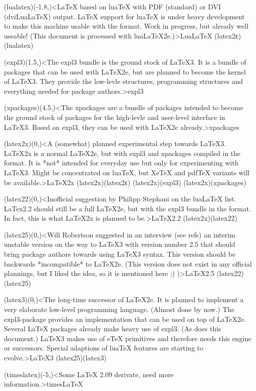 {	\tonode[\vip](lualatex)(-1.8,\layer)<LaTeX based on luaTeX with PDF (standard) or DVI (dviLuaLaTeX) output. LaTeX support for luaTeX is under heavy development to make this machine usable with the format. Work in progress, but already well useable! (This document is processed with luaLaTeX2e.)>{Lua\LaTeX}
	\todraw*(latex2ε)(lualatex)
	\steplayer[-1.5]

	\tonode[\package](expl3)(1.5,\layer)<The expl3 bundle is the ground stock of LaTeX3. It is a bundle of packages that can be used with LaTeX2e, but are planned to become the kernel of LaTeX3. They provide the low-levle structures, programming structures and everything needed for package authors.>{expl3}

	\tonode[\package](xpackages)(4.5,\layer)<The xpackages are a bundle of packages intended to become the ground stock of packages for the high-levle and user-level interface in LaTeX3. Based on expl3, they can be used with LaTeX2e already.>{xpackages}
	\steplayer[-1.5]

	\tonode[\planned](latex2x)(0,\layer)<A (somewhat) planned experimental step towards LaTeX3. LaTeX2x is a normal LaTeX2e, but with expl3 and xpackages compiled in the format. It is *not* intended for everyday use but only for experimenting with LaTeX3. Might be concentrated on luaTeX, but XeTeX and pdfTeX variants will be available.>{\LaTeX2x}
	\todraw(latex2x)(latex2ε)
	\todraw(latex2x)(expl3)
	\todraw(latex2x)(xpackages)
	\steplayer[-2]

	\tonode[\planned](latex22)(0,\layer)<Inofficial suggestion by Philipp Stephani on the luaLaTeX list. LaTex2.2 should still be a full LaTeX2e, but with the expl3 bundle in the format. In fact, this is what LaTeX2x is planned to be.>{\LaTeX2.2}
	\todraw(latex2x)(latex22)
	\steplayer[-2]

	\tonode[\planned](latex25)(0,\layer)<Will Robertson suggested in an interview (see refs) an interim unstable version on the way to LaTeX3 with version number 2.5 that should bring package authors towards using LaTeX3 syntax. This version should be backwards *incompatible* to LaTeX2e. (This version does not exist in any official plannings, but I liked the idea, so it is mentioned here ;) )>{\LaTeX2.5}
	\todraw(latex22)(latex25)
	
	\steplayer[-3]
	\tonode[\planned](latex3)(0,\layer)<The long-time successor of LaTeX2e. It is planned to implement a very elaborate low-level programming language. (Almost done by now.) The expl3-package provides an implementation that can be used on top of LaTeX2e. Several LaTeX packages already make heavy use of expl3. (As does this document.) LaTeX3 makes use of eTeX primitives and therefore needs this engine or successors. Special adaptions of luaTeX features are starting to evolve.>{\LaTeX{}3}
	\todraw(latex25)(latex3)

	\steplayer[-3]
	\tonode[\experimental](timeslatex)(-5,\layer)<Some LaTeX 2.09 derivate, need more information.>{times\LaTeX}
}

